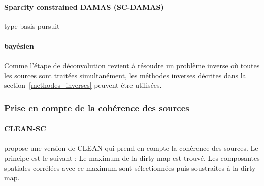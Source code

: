  







\paragraph{Sparcity constrained DAMAS (SC-DAMAS)}
\cite{Yardibi2008}

type basis pursuit

\paragraph{bayésien}


Comme l'étape de déconvolution revient à résoudre un problème inverse où toutes les sources sont traitées simultanément, les méthodes inverses décrites dans la section~\ref{methodes_inverses} peuvent être utilisées.


\subsubsection{Prise en compte de la cohérence des sources}
\paragraph{CLEAN-SC}
\cite{Sijtsma2007} propose une version de CLEAN qui prend en compte la cohérence des sources. Le principe est le suivant : Le maximum de la dirty map est trouvé.  Les composantes spatiales corrélées avec ce maximum sont sélectionnées puis soustraites à la dirty map.\\

